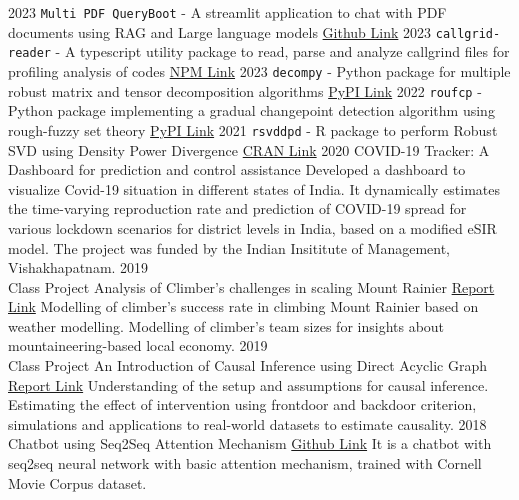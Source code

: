 \documentclass[9pt]{developercv} %
\begin{document}
\begin{entrylist}
    \vspace{-10pt}
    \entry
    {2023}
    {\texttt{Multi PDF QueryBoot} - A streamlit application to chat with PDF documents using RAG and Large language models}
    {\href{https://github.com/subroy13/multi-pdf-querybot}{Github Link}}
    {}
    \vspace{-10pt}
    \entry
    {2023}
    {\texttt{callgrid-reader} - A typescript utility package to read, parse and analyze callgrind files for profiling analysis of codes}
    {\href{https://www.npmjs.com/package/callgrind-reader}{NPM Link}}
    {}
    \vspace{-10pt}
    \entry
    {2023}
    {\texttt{decompy} - Python package for multiple robust matrix and tensor decomposition algorithms}
    {\href{https://pypi.org/project/decompy/}{PyPI Link}}
    {}
    \vspace{-10pt}
    \entry
    {2022}
    {\texttt{roufcp} - Python package implementing a gradual changepoint detection algorithm using rough-fuzzy set theory}
    {\href{https://pypi.org/project/roufcp/}{PyPI Link}}
    {}
    \vspace{-10pt}
    \entry
    {2021}
    {\texttt{rsvddpd} - R package to perform Robust SVD using Density Power Divergence}
    {\href{https://cran.r-project.org/web/packages/rsvddpd/index.html}{CRAN Link}}
    {}
    \entry
    {2020}
    {COVID-19 Tracker: A Dashboard for prediction and control assistance}
    {}
    {\small Developed a dashboard to visualize Covid-19 situation in different states of India. It dynamically estimates the time-varying reproduction rate and prediction of COVID-19 spread for various lockdown scenarios for district levels in India, based on a modified eSIR model. The project was funded by the Indian Insititute of Management, Vishakhapatnam.}
    \entry
    {2019\\Class Project}
    {Analysis of Climber's challenges in scaling Mount Rainier}
    {\href{https://github.com/subroy13/mount-rainier-case-study}{Report Link} }
    {\small Modelling of climber's success rate in climbing Mount Rainier based on weather modelling. Modelling of climber's team sizes for insights about mountaineering-based local economy.}
    \entry
    {2019\\Class Project}
    {An Introduction of Causal Inference using Direct Acyclic Graph}
    {\href{https://www.statwizard.in/aboutme/causal-dag/final-report.pdf}{Report Link} }
    {\small Understanding of the setup and assumptions for causal inference. Estimating the effect of intervention using frontdoor and backdoor criterion, simulations and applications to real-world datasets to estimate causality.}
    \entry
    {2018}
    {Chatbot using Seq2Seq Attention Mechanism}
    {\href{https://github.com/subroy13/seq2seq-attention-bot}{Github Link}}
    {\small It is a chatbot with seq2seq neural network with basic attention mechanism, trained with Cornell Movie Corpus dataset.}
\end{entrylist}
\end{document}

